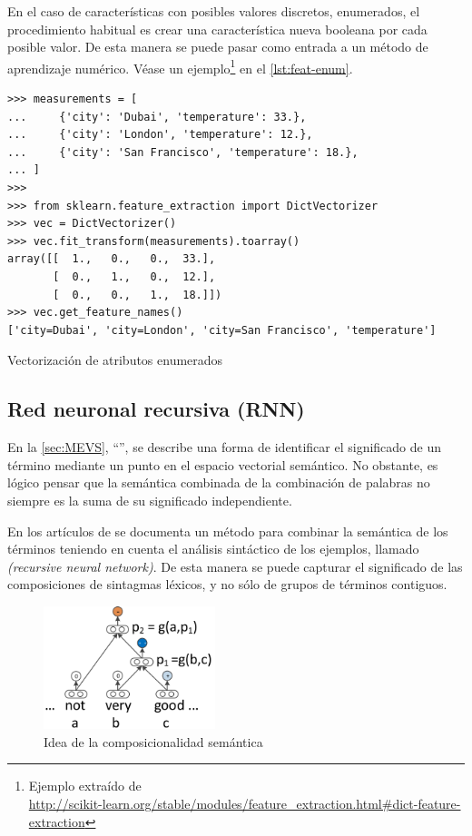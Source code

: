 En el caso de características con posibles valores discretos, enumerados, el procedimiento habitual es crear una característica nueva booleana por cada posible valor. De esta manera se puede pasar como entrada a un método de aprendizaje numérico. Véase un ejemplo\footnote{Ejemplo extraído de\\
\url{http://scikit-learn.org/stable/modules/feature_extraction.html\#dict-feature-extraction}} en el \autoref{lst:feat-enum}.

\begin{listing}[htbp]
\begin{verbatim}
>>> measurements = [
...     {'city': 'Dubai', 'temperature': 33.},
...     {'city': 'London', 'temperature': 12.},
...     {'city': 'San Francisco', 'temperature': 18.},
... ]
>>> 
>>> from sklearn.feature_extraction import DictVectorizer
>>> vec = DictVectorizer()
>>> vec.fit_transform(measurements).toarray()
array([[  1.,   0.,   0.,  33.],
       [  0.,   1.,   0.,  12.],
       [  0.,   0.,   1.,  18.]])
>>> vec.get_feature_names()
['city=Dubai', 'city=London', 'city=San Francisco', 'temperature']
\end{verbatim}
\caption{Vectorización de atributos enumerados}
\label{lst:feat-enum}
\end{listing}


\FloatBarrier
\subsection{Red neuronal recursiva (RNN)} 

En la \autoref{sec:MEVS}, ``'', se describe una forma de identificar el significado de un término mediante un punto en el espacio vectorial semántico. No obstante, es lógico pensar que la semántica combinada de la combinación de palabras no siempre es la suma de su significado independiente.

En los artículos de \citet{Socher2012,Socher2013} se documenta un método para combinar la semántica de los términos teniendo en cuenta el análisis sintáctico de los ejemplos, llamado  \emph{(recursive neural network)}. De esta manera se puede capturar el significado de las composiciones de sintagmas léxicos, y no sólo de grupos de términos contiguos.

\begin{figure}[htbp]
\centering
\includegraphics[width=5cm]{semantic-compositionality}
\caption[Idea de la composicionalidad semántica]{Idea de la composicionalidad semántica \citep{Socher2013}}
\label{fig:semantic-compositionality}
\end{figure}

